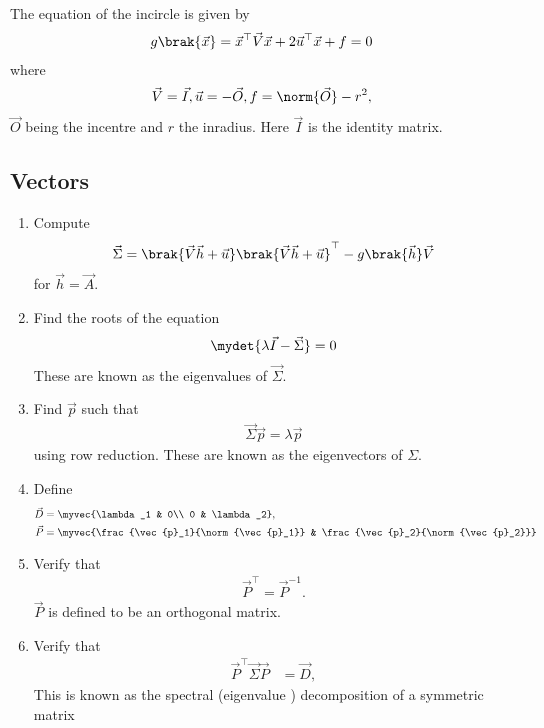 The equation of the incircle is given by 
		\begin{align}
			 \label{eq:conic_quad_form}
	  {g}\brak{\vec{x}}=
			\vec{x}^{\top}\vec{V}\vec{x}+2\vec{u}^{\top}\vec{x}+f = 0
		\end{align}
		where 
		\begin{align}
			\vec{V}=\vec{I}, \vec{u}=-\vec{O}, f = \norm{\vec{O}}-r^2,
		\end{align}
		$\vec{O}$ being the incentre and $r$ the inradius.  Here $\vec{I}$ is the identity matrix.
		\subsection{Vectors}
\begin{enumerate}[label=\thesubsection.\arabic*.,ref=\thesubsection.\theenumi]
\item Compute 
\begin{align}
\vec{\Sigma} = 
\brak{\vec{V}\vec{h}+\vec{u}}
	  \brak{\vec{V}\vec{h}+\vec{u}}^{\top}
   -
	  {g}\brak{\vec{h}}\vec{V}
\end{align}
for $\vec{h}=\vec{A}$.
\item Find the roots of the equation
\begin{align}
	\mydet{\lambda \vec{I}-\vec{\Sigma}} = 0
\end{align}
These are known as the eigenvalues of $\vec{\Sigma}$.
\item Find $\vec{p}$  such that 
\begin{align}
	\vec{\Sigma}\vec{p}
	=\lambda\vec{p}
\end{align}
using row reduction.  These are known as the eigenvectors of $\Sigma$.
\item Define
    \begin{align}
      \label{eq:conic_parmas_eig_def-D}
      \vec{D} &= \myvec{\lambda_1 & 0\\ 0 & \lambda_2}, 
      \\
	    \vec{P} &= \myvec{\frac{\vec{p}_1}{\norm{\vec{p}_1}} & \frac{\vec{p}_2}{\norm{\vec{p}_2}}}
      \label{eq:eigevecP}
    \end{align}
    \item Verify that
  \begin{align}
\vec{P}^{\top}=\vec{P}^{-1}.
  \label{eq:orth-mat}
  \end{align}
  $\vec{P}$ is defined to be an orthogonal matrix.
\item Verify that
    \begin{align}
      \label{eq:conic_parmas_eig_def}
      \vec{P}^{\top}\vec{\Sigma}\vec{P} &= \vec{D},
    \end{align} 
		This is known as the spectral (eigenvalue ) decomposition of a symmetric matrix 


\end{enumerate}
